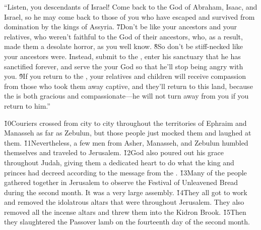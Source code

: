 \begin{poetry}
\poeml ``Listen, you descendants of Israel! Come back to the  God of Abraham, Isaac, and Israel, so he may come back to those of you who have escaped and survived from domination by the kings of Assyria. \v{7}Don't be like your ancestors and your relatives, who weren't faithful to the  God of their ancestors, who, as a result, made them a desolate horror, as you well know. \v{8}So don't be stiff-necked like your ancestors were. Instead, submit to the , enter his sanctuary that he has sanctified forever, and serve the  your God so that he'll stop being angry with you. \v{9}If you return to the , your relatives and children will receive compassion from those who took them away captive, and they'll return to this land, because the  is both gracious and compassionate---he will not turn away from you if you return to him.''
\end{poetry}

\v{10}Couriers crossed from city to city throughout the territories of Ephraim and Manasseh as far as Zebulun, but those people just mocked them and laughed at them. \v{11}Nevertheless, a few men from Asher, Manasseh, and Zebulun humbled themselves and traveled to Jerusalem. \v{12}God also poured out his grace throughout Judah, giving them a dedicated heart to do what the king and princes had decreed according to the message from the . \v{13}Many of the people gathered together in Jerusalem to observe the Festival of Unleavened Bread during the second month. It was a very large assembly. \v{14}They all got to work and removed the idolatrous altars that were throughout Jerusalem. They also removed all the incense altars and threw them into the Kidron Brook. \v{15}Then they slaughtered the Passover lamb on the fourteenth day of the second month.

